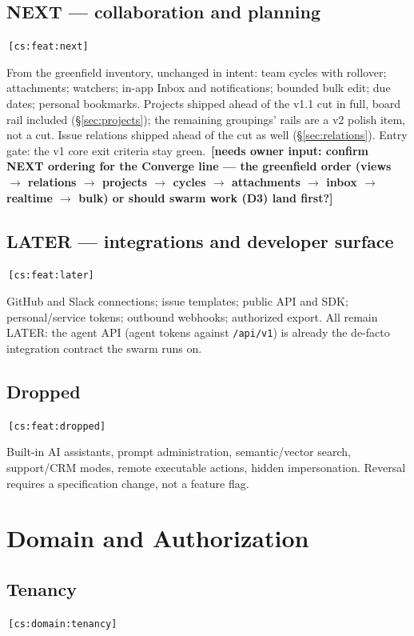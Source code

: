 \documentclass[11pt,a4paper]{report}
\newcommand{\cs}[1]{\,\texttt{\scriptsize[cs:#1]}\label{cs:#1}}
\newcommand{\owner}[1]{\,\textcolor{red!60!black}{\textbf{[needs owner input: #1]}}}
\begin{document}
\section{NEXT --- collaboration and planning}
\cs{feat:next}

From the greenfield inventory, unchanged in intent: team cycles with
rollover; attachments; watchers; in-app Inbox and notifications; bounded
bulk edit; due dates; personal bookmarks. Projects shipped ahead of the
v1.1 cut in full, board rail included
(\S\ref{sec:projects}); the remaining groupings' rails are a v2 polish
item, not a cut. Issue relations shipped ahead of the cut as well
(\S\ref{sec:relations}).
Entry gate: the v1 core exit criteria stay green. \owner{confirm NEXT
  ordering for the Converge line --- the greenfield order (views $\to$
  relations $\to$ projects $\to$ cycles $\to$ attachments $\to$ inbox
  $\to$ realtime $\to$ bulk) or should swarm work (D3) land first?}

\section{LATER --- integrations and developer surface}
\cs{feat:later}

GitHub and Slack connections; issue templates; public API and SDK;
personal/service tokens; outbound webhooks; authorized export. All
remain LATER: the agent API (agent tokens against \texttt{/api/v1}) is
already the de-facto integration contract the swarm runs on.

\section{Dropped}
\cs{feat:dropped}

Built-in AI assistants, prompt administration, semantic/vector search,
support/CRM modes, remote executable actions, hidden impersonation.
Reversal requires a specification change, not a feature flag.

\chapter{Domain and Authorization}
\label{ch:domain}

\section{Tenancy}
\cs{domain:tenancy}
\end{document}
